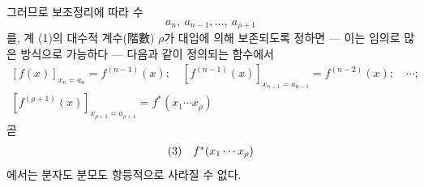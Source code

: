 
그러므로 보조정리에 따라 수
\[
 a_n,\ a_{n-1},\ldots,\ a_{\rho+1}
\]
를, 계 (1)의 대수적 계수(階數) $\rho$가 대입에 의해 보존되도록 정하면 --- 이는 임의로 많은 방식으로 가능하다 --- 다음과 같이 정의되는 함수에서
\[
\begin{array}{c}
[f(x)]_{x_n=a_n}=f^{(n-1)}(x);\quad
[f^{(n-1)}(x)]_{x_{n-1}=a_{n-1}}=f^{(n-2)}(x);\quad\cdots;\\[0.25em]
[f^{(\rho+1)}(x)]_{x_{\rho+1}=a_{\rho+1}}=f^*(x_1\cdots x_\rho)
\end{array}
\]
곧
\[
\begin{array}{@{}l@{\quad}c@{}}
(3)& f^*(x_1\cdots x_\rho)
\end{array}
\]
에서는 분자도 분모도 항등적으로 사라질 수 없다.
